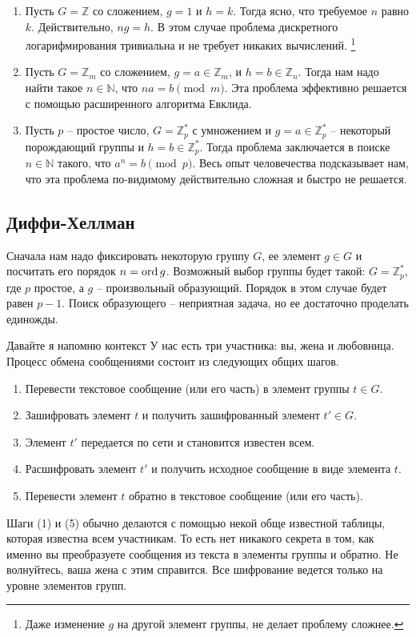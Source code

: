 \begin{examples}
\begin{enumerate}
\item Пусть $G = \mathbb Z$ со сложением, $g = 1$ и $h = k$. Тогда ясно, что требуемое $n$ равно $k$. Действительно, $ng = h$. В этом случае проблема дискретного логарифмирования тривиальна и не требует никаких вычислений.%
\footnote{Даже изменение $g$ на другой элемент группы, не делает проблему сложнее.}

\item Пусть $G = \mathbb Z_m$ со сложением, $g = a\in \mathbb Z_m$, и $h = b\in \mathbb Z_n$. Тогда нам надо найти такое $n\in\mathbb N$, что $na = b \pmod m$. Эта проблема эффективно решается с помощью расширенного алгоритма Евклида.

\item Пусть $p$ -- простое число, $G = \mathbb Z_p^*$ с умножением и $g = a\in \mathbb Z_p^*$ -- некоторый порождающий группы и $h = b\in \mathbb Z_p^*$. Тогда проблема заключается в поиске $n\in \mathbb N$ такого, что $a^n = b \pmod p$. Весь опыт человечества подсказывает нам, что эта проблема по-видимому действительно сложная и быстро не решается.
\end{enumerate}
\end{examples}

\subsection{Диффи-Хеллман}

Сначала нам надо фиксировать некоторую группу $G$, ее элемент $g\in G$ и посчитать его порядок $n = \operatorname{ord} g$.
Возможный выбор группы будет такой: $G = \mathbb Z_p^*$, где $p$ простое, а $g$ -- произвольный образующий. Порядок в этом случае будет равен $p - 1$. Поиск образующего -- неприятная задача, но ее достаточно проделать единожды.

Давайте я напомню контекст
У нас есть три участника: вы, жена и любовница.
Процесс обмена сообщениями состоит из следующих общих шагов.
\begin{enumerate}
\item Перевести текстовое сообщение (или его часть) в элемент группы $t\in G$.

\item Зашифровать элемент $t$ и получить зашифрованный элемент $t'\in G$.

\item Элемент $t'$ передается по сети и становится известен всем.

\item Расшифровать элемент $t'$ и получить исходное сообщение в виде элемента $t$.

\item Перевести элемент $t$ обратно в текстовое сообщение (или его часть).
\end{enumerate}
Шаги (1) и (5) обычно делаются с помощью некой обще известной таблицы, которая известна всем участникам. То есть нет никакого секрета в том, как именно вы преобразуете сообщения из текста в элементы группы и обратно. Не волнуйтесь, ваша жена с этим справится. Все шифрование ведется только на уровне элементов групп.

